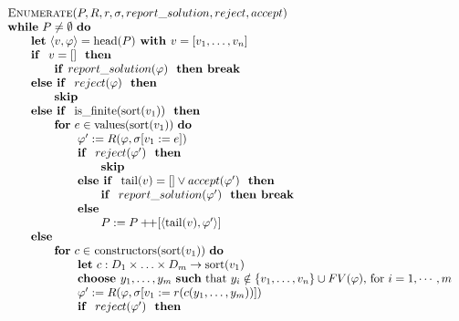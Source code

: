 \documentclass{article}
\newcommand{\concat}{\ensuremath{+\!\!+}}
\begin{document}
\[
\begin{tabular}{l}
\textsc{Enumerate}($P,R,r,\sigma, report\_solution, reject, accept)$ \\
\textbf{while} $P\neq \emptyset $ \textbf{do} \\
\qquad \textbf{let} $\left\langle v,\varphi \right\rangle =\mathrm{head}(P) 
\textbf{ with } v = [v_1, \ldots, v_n]$\\
\qquad \textbf{if } $v = []$ \textbf{ then} \\
\qquad \qquad \textbf{if }$report\_solution(\varphi)$ \textbf{ then break} \\
\qquad \textbf{else if } $reject(\varphi)$ \textbf{ then} \\
\qquad \qquad \textbf{skip} \\
\qquad \textbf{else if } $\mathrm{is\_finite}(\mathrm{sort}(v_{1}))$ \textbf{ then} \\
\qquad \qquad \textbf{for} $e\in \mathrm{values}(\mathrm{sort}(v_{1}))$ \textbf{do} \\
\qquad \qquad \qquad $\varphi^{\prime}:=R(\varphi,\sigma[v_{1}:=e])$ \\
\qquad \qquad \qquad \textbf{if } $reject(\varphi')$ \textbf{ then} \\
\qquad \qquad \qquad \qquad \textbf{skip } \\
\qquad \qquad \qquad \textbf{else if } $\mathrm{tail}(v) = [] \vee accept(\varphi')$ \textbf{ then} \\
\qquad \qquad \qquad \qquad \textbf{if } $report\_solution(\varphi')$ \textbf{ then break} \\
\qquad \qquad \qquad \textbf{else } \\ 
\qquad \qquad \qquad \qquad $P:=P\concat\lbrack \left\langle \mathrm{tail}(v), \varphi' \right\rangle ]$ \\
\qquad \textbf{else } \\
\qquad \qquad \textbf{for} $c\in $ $\mathrm{constructors}(\mathrm{sort}(v_{1}))$ \textbf{do} \\
\qquad \qquad \qquad \textbf{let} $c:D_{1}\times \ldots \times
D_{m}\rightarrow \mathrm{sort}(v_{1})$ \\
\qquad \qquad \qquad \textbf{choose }$y_1,\ldots ,y_m$
\textbf{such} that $y_i \notin \{ v_1, \ldots ,v_n \} \cup FV(\varphi)$, for $i=1, \cdots, m$ \\
\qquad \qquad \qquad $\varphi ^{\prime }:=R(\varphi ,\sigma \lbrack v_{1}:=r(c(y_{1},\ldots ,y_{m}))])$ \\
\qquad \qquad \qquad \textbf{if } $reject(\varphi')$ \textbf{ then} \\

\end{tabular}\]
\end{document}
